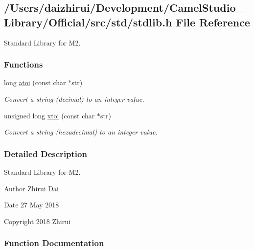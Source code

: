 \hypertarget{a00116}{}\subsection{/\+Users/daizhirui/\+Development/\+Camel\+Studio\+\_\+\+Library/\+Official/src/std/stdlib.h File Reference}
\label{a00116}


Standard Library for M2.  


\subsubsection*{Functions}
\begin{DoxyCompactItemize}
\item 
long \mbox{\hyperlink{a00116_a36f90d5de53f568b0fc5266ce013b9c5}{atoi}} (const char $\ast$str)
\begin{DoxyCompactList}\small\item\em Convert a string (decimal) to an integer value. \end{DoxyCompactList}\item 
unsigned long \mbox{\hyperlink{a00116_a9d6165da864d16ad50c13690c1e7d7ea}{xtoi}} (const char $\ast$str)
\begin{DoxyCompactList}\small\item\em Convert a string (hexadecimal) to an integer value. \end{DoxyCompactList}\end{DoxyCompactItemize}


\subsubsection{Detailed Description}
Standard Library for M2. 

\begin{DoxyAuthor}{Author}
Zhirui Dai 
\end{DoxyAuthor}
\begin{DoxyDate}{Date}
27 May 2018 
\end{DoxyDate}
\begin{DoxyCopyright}{Copyright}
2018 Zhirui 
\end{DoxyCopyright}


\subsubsection{Function Documentation}
\mbox{\label{a00116_a36f90d5de53f568b0fc5266ce013b9c5}} 
